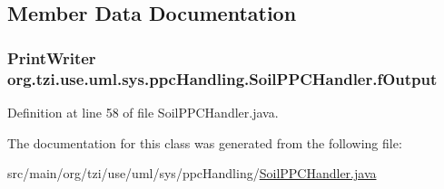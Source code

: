\subsection{Member Data Documentation}
\hypertarget{classorg_1_1tzi_1_1use_1_1uml_1_1sys_1_1ppc_handling_1_1_soil_p_p_c_handler_af8d1bac98efed411e726128c57c4214f}{
\subsubsection[{f\-Output}]{\setlength{\rightskip}{0pt plus 5cm}Print\-Writer org.\-tzi.\-use.\-uml.\-sys.\-ppc\-Handling.\-Soil\-P\-P\-C\-Handler.\-f\-Output\hspace{0.3cm}{\ttfamily [protected]}}}\label{classorg_1_1tzi_1_1use_1_1uml_1_1sys_1_1ppc_handling_1_1_soil_p_p_c_handler_af8d1bac98efed411e726128c57c4214f}


Definition at line 58 of file Soil\-P\-P\-C\-Handler.\-java.



The documentation for this class was generated from the following file\-:\begin{DoxyCompactItemize}
\item 
src/main/org/tzi/use/uml/sys/ppc\-Handling/\hyperlink{_soil_p_p_c_handler_8java}{Soil\-P\-P\-C\-Handler.\-java}\end{DoxyCompactItemize}
